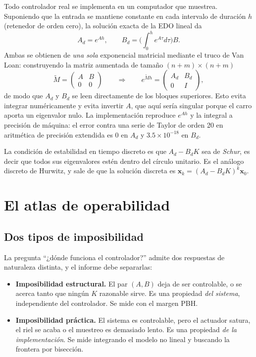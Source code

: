 \documentclass[11pt,letterpaper]{article}
\theoremstyle{definition}
\theoremstyle{plain}
\theoremstyle{remark}
\newcommand{\xv}{\bm{x}}
\begin{document}
Todo controlador real se implementa en un computador que muestrea. Suponiendo
que la entrada se mantiene constante en cada intervalo de duración $h$
(retenedor de orden cero), la solución exacta de la EDO lineal da
\[
A_d=e^{Ah},\qquad B_d=\Big(\int_0^h e^{A\tau}d\tau\Big)B.
\]
Ambas se obtienen de \emph{una sola} exponencial matricial mediante el truco de
Van Loan: construyendo la matriz aumentada de tamaño $(n+m)\times(n+m)$
\[
\widetilde M=\begin{pmatrix}A&B\\0&0\end{pmatrix}
\qquad\Longrightarrow\qquad
e^{\widetilde M h}=\begin{pmatrix}A_d&B_d\\0&I\end{pmatrix},
\]
de modo que $A_d$ y $B_d$ se leen directamente de los bloques superiores. Esto
evita integrar numéricamente y evita invertir $A$, que aquí sería singular
porque el carro aporta un eigenvalor nulo. La implementación reproduce
$e^{Ah}$ y la integral a precisión de máquina: el error contra una serie de
Taylor de orden 20 en aritmética de precisión extendida es $0$ en $A_d$ y
$3.5\times10^{-18}$ en $B_d$.

La condición de estabilidad en tiempo discreto es que $A_d-B_dK$ sea de
\emph{Schur}, es decir que todos sus eigenvalores estén dentro del círculo
unitario. Es el análogo discreto de Hurwitz, y sale de que la solución discreta
es $\xv_k=(A_d-B_dK)^k\xv_0$.

\section{El atlas de operabilidad}
\label{sec:atlas}

\subsection{Dos tipos de imposibilidad}

La pregunta ``¿dónde funciona el controlador?'' admite dos respuestas de
naturaleza distinta, y el informe debe separarlas:

\begin{itemize}
  \item \textbf{Imposibilidad estructural.} El par $(A,B)$ deja de ser
  controlable, o se acerca tanto que ningún $K$ razonable sirve. Es una
  propiedad \emph{del sistema}, independiente del controlador. Se mide con el
  margen PBH.
  \item \textbf{Imposibilidad práctica.} El sistema es controlable, pero el
  actuador satura, el riel se acaba o el muestreo es demasiado lento. Es una
  propiedad \emph{de la implementación}. Se mide integrando el modelo no lineal
  y buscando la frontera por bisección.
\end{itemize}
\end{document}
